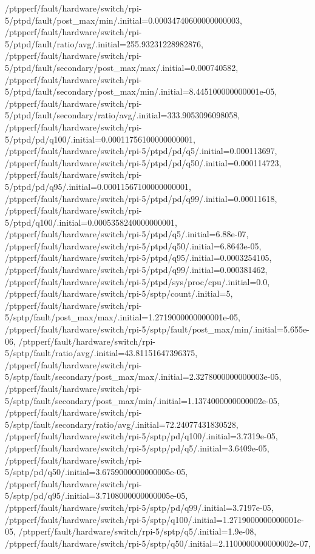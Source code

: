 {    /ptpperf/fault/hardware/switch/rpi-5/ptpd/fault/post_max/min/.initial=0.00034740600000000003,
    /ptpperf/fault/hardware/switch/rpi-5/ptpd/fault/ratio/avg/.initial=255.93231228982876,
    /ptpperf/fault/hardware/switch/rpi-5/ptpd/fault/secondary/post_max/max/.initial=0.000740582,
    /ptpperf/fault/hardware/switch/rpi-5/ptpd/fault/secondary/post_max/min/.initial=8.445100000000001e-05,
    /ptpperf/fault/hardware/switch/rpi-5/ptpd/fault/secondary/ratio/avg/.initial=333.9053096098058,
    /ptpperf/fault/hardware/switch/rpi-5/ptpd/pd/q100/.initial=0.00011756100000000001,
    /ptpperf/fault/hardware/switch/rpi-5/ptpd/pd/q5/.initial=0.000113697,
    /ptpperf/fault/hardware/switch/rpi-5/ptpd/pd/q50/.initial=0.000114723,
    /ptpperf/fault/hardware/switch/rpi-5/ptpd/pd/q95/.initial=0.00011567100000000001,
    /ptpperf/fault/hardware/switch/rpi-5/ptpd/pd/q99/.initial=0.00011618,
    /ptpperf/fault/hardware/switch/rpi-5/ptpd/q100/.initial=0.0005358240000000001,
    /ptpperf/fault/hardware/switch/rpi-5/ptpd/q5/.initial=6.88e-07,
    /ptpperf/fault/hardware/switch/rpi-5/ptpd/q50/.initial=6.8643e-05,
    /ptpperf/fault/hardware/switch/rpi-5/ptpd/q95/.initial=0.0003254105,
    /ptpperf/fault/hardware/switch/rpi-5/ptpd/q99/.initial=0.000381462,
    /ptpperf/fault/hardware/switch/rpi-5/ptpd/sys/proc/cpu/.initial=0.0,
    /ptpperf/fault/hardware/switch/rpi-5/sptp/count/.initial=5,
    /ptpperf/fault/hardware/switch/rpi-5/sptp/fault/post_max/max/.initial=1.2719000000000001e-05,
    /ptpperf/fault/hardware/switch/rpi-5/sptp/fault/post_max/min/.initial=5.655e-06,
    /ptpperf/fault/hardware/switch/rpi-5/sptp/fault/ratio/avg/.initial=43.81151647396375,
    /ptpperf/fault/hardware/switch/rpi-5/sptp/fault/secondary/post_max/max/.initial=2.3278000000000003e-05,
    /ptpperf/fault/hardware/switch/rpi-5/sptp/fault/secondary/post_max/min/.initial=1.1374000000000002e-05,
    /ptpperf/fault/hardware/switch/rpi-5/sptp/fault/secondary/ratio/avg/.initial=72.24077431830528,
    /ptpperf/fault/hardware/switch/rpi-5/sptp/pd/q100/.initial=3.7319e-05,
    /ptpperf/fault/hardware/switch/rpi-5/sptp/pd/q5/.initial=3.6409e-05,
    /ptpperf/fault/hardware/switch/rpi-5/sptp/pd/q50/.initial=3.6759000000000005e-05,
    /ptpperf/fault/hardware/switch/rpi-5/sptp/pd/q95/.initial=3.7108000000000005e-05,
    /ptpperf/fault/hardware/switch/rpi-5/sptp/pd/q99/.initial=3.7197e-05,
    /ptpperf/fault/hardware/switch/rpi-5/sptp/q100/.initial=1.2719000000000001e-05,
    /ptpperf/fault/hardware/switch/rpi-5/sptp/q5/.initial=1.9e-08,
    /ptpperf/fault/hardware/switch/rpi-5/sptp/q50/.initial=2.1100000000000002e-07,
}
